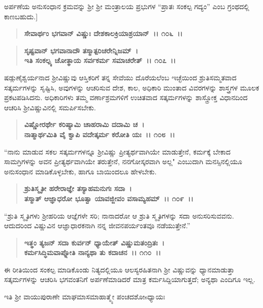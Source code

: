 ಅರ್ಪಣೆಯ ಅನುಸಂಧಾನ ಕ್ರಮವನ್ನು ಶ‍್ರೀ ಶ‍್ರೀ ಮಂತ್ರಾಲಯ ಪ್ರಭುಗಳ “ಪ್ರಾತಃ ಸಂಕಲ್ಪ ಗದ್ಯಂ” ಎಂಬ ಗ್ರಂಥದಲ್ಲಿ ಕಾಣಬಹುದು.]

\begin{verse}
\textbf{ಸೇವಾರ್ಥಂ ಭಗವಾನ್ ವಿಷ್ಣುಃ ದೇಶಕಾಲಕ್ರಿಯಾಶ್ರಯಾನ್~।। ೧೦೬~।।} 
\end{verse}

\begin{verse}
\textbf{ಸೃಷ್ಟವಾನ್ ಭಗವಾನಾದೌ ತಸ್ಮಾತ್ಪರಿಚರೇನ್ನಿಜಮ್~।}\\\textbf{ಇತಿ ಸಂಕಲ್ಪ್ಯ ಚೋತ್ಥಾಯ ಸರ್ವಕರ್ಮ ಸಮಾಚರೇತ್~।। ೧೦೭~।।}
\end{verse}

ಷಡ್ಗುಣೈಶ್ವರ್ಯನಾದ ಶ‍್ರೀವಿಷ್ಣುವು ಆಸ್ತಿಕರಿಗೆ ತನ್ನ ಸೇವೆಯು ದೊರೆಯಲೆಂಬ ಇಚ್ಛೆಯಿಂದ ಶ್ರುತಿಸಮ್ಮತವಾದ ಸತ್ಕರ್ಮಗಳನ್ನು ಸೃಷ್ಟಿಸಿ, ಅವುಗಳನ್ನು ಆಚರಿಸುವ ದೇಶ, ಕಾಲ, ಅಧಿಕಾರಿ ಮುಂತಾದ ವಿವರಗಳನ್ನು ಶಾಸ್ತ್ರಗಳ ಮೂಲಕ ಪ್ರಕಟಪಡಿಸಿದನು. ಅಧಿಕಾರಿಗಳು ತಮ್ಮ ವರ್ಣಾಶ್ರಮಗಳಿಗೆ ಉಚಿತವಾದ ಸತ್ಕರ್ಮಗಳನ್ನು ಶಾಸ್ತ್ರೋಕ್ತ ವಿಧಾನದಿಂದ ಆಚರಿಸಿ ಶ‍್ರೀವಿಷ್ಣುವಿನಲ್ಲಿ ಸಮರ್ಪಿಸಬೇಕು.

\begin{verse}
\textbf{ವಿಷ್ಣೋರರ್ಥೇ ಕರಿಷ್ಯಾಮಿ ಚಾಹರಾಮಿ ದದಾಮಿ ಚ~।}\\\textbf{ನಾತ್ಮಾರ್ಥಮಿತಿ ವೈ ಕ್ವಾಪಿ ವದೇತ್ಕರ್ಮ ಕರೋತಿ ಯಃ~।। ೧೦೮~।।}
\end{verse}

“ನಾನು ಮಾಡುವ ಸಕಲ ಸತ್ಕರ್ಮಗಳನ್ನೂ ಶ‍್ರೀವಿಷ್ಣು ಪ್ರೀತ್ಯರ್ಥವಾಗಿಯೇ ಮಾಡುತ್ತೇನೆ, ಕರ್ಮಕ್ಕೆ ಬೇಕಾದ ಸಾಮಗ್ರಿಗಳನ್ನು ಅವನ ಪ್ರೀತ್ಯರ್ಥವಾಗಿಯೇ ತರುತ್ತೇನೆ, ನನಗೋಸ್ಕರವಾಗಿ ಅಲ್ಲ" ಎಂಬುದಾಗಿ ಮನಸ್ಸಿನಲ್ಲಿಯೂ ಅನುಸಂಧಾನ ಮಾಡಿಕೊಳ್ಳಬೇಕು, ಹಾಗೂ ಬಾಯಿಂದಲೂ ಹೇಳಬೇಕು.

\begin{verse}
\textbf{ಶ್ರುತಿಸ್ಮೃತೀ ಹರೇರಾಜ್ಞೇ ತಸ್ಯಾಹಮನುಗಃ ಸದಾ~।}\\\textbf{ತಸ್ಮಾತ್ ಆಜ್ಞಾಧರೋ ಭೂತ್ವಾ ಯಾವಜ್ಜೀವಂ ವಸಾಮ್ಯಹಮ್~।। ೧೦೯~।।}
\end{verse}

“ಶ್ರುತಿ ಸ್ಮೃತಿಗಳು ಶ‍್ರೀಹರಿಯ ಆಜ್ಞೆಗಳೇ ಸರಿ; ನಾನಾದರೋ ಆ ಶ್ರುತಿ ಸ್ಮೃತಿಗಳನ್ನು ಸದಾ ಅನುಸರಿಸುವವನು. ಆದುದರಿಂದ ವಿಷ್ಣುವಿನ ಆಜ್ಞಾಧಾರಕನಾಗಿ ನನ್ನ ಜೀವನಪರ್ಯಂತವೂ ನಡೆಯುತ್ತೇನೆ.”

\begin{verse}
\textbf{ಇತ್ಥಂ ತ್ಯಜನ್ ಸದಾ ಕುರ್ವನ್ ಧ್ಯಾಯೇತ್ ವಿಷ್ಣುಮತಂದ್ರಿತಃ~।}\\\textbf{ಕರ್ಮಸಿದ್ಧಿಮವಾಪ್ನೋತಿ ನಾನ್ಯಥಾ ತು ಕದಾಚನ~।। ೧೧೦~।।}
\end{verse}

ಈ ರೀತಿಯಿಂದ ಸಂಕಲ್ಪ ಮಾಡಿಕೊಂಡು ನಿತ್ಯದಲ್ಲಿಯೂ ಆಲಸ್ಯರಹಿತನಾಗಿ ಶ‍್ರೀ ವಿಷ್ಣುವನ್ನು ಧ್ಯಾನಮಾಡುತ್ತಾ ಸತ್ಕರ್ಮಗಳನ್ನು ಆಚರಿಸಿ ಭಗವಂತನಿಗೆ ಅರ್ಪಣೆಮಾಡಿದರೆ ಮಾತ್ರ ಕರ್ಮಸಿದ್ದಿಯಾಗುತ್ತದೆ; ಅನ್ಯಥಾ ಎಂದಿಗೂ ಇಲ್ಲ.

\begin{center}
ಇತಿ ಶ‍್ರೀ ವಾಯುಪುರಾಣೇ ಮಾಘಮಾಸಮಾಹಾತ್ಮ್ಯೇ ಪಂಚದಶೋsಧ್ಯಾಯಃ 
\end{center}

